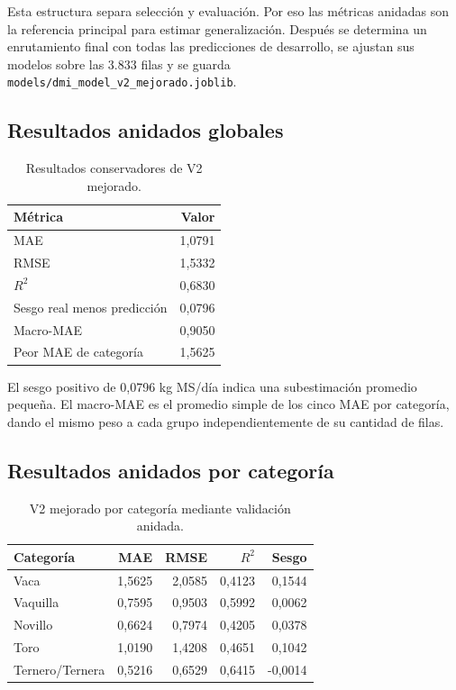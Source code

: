 \documentclass[11pt,a4paper]{article}
\newcommand{\codigo}[1]{\nolinkurl{#1}}
\begin{document}
Esta estructura separa selección y evaluación. Por eso las métricas anidadas son la referencia principal para estimar generalización. Después se determina un enrutamiento final con todas las predicciones de desarrollo, se ajustan sus modelos sobre las 3.833 filas y se guarda \codigo{models/dmi_model_v2_mejorado.joblib}.

\subsection{Resultados anidados globales}

\begin{table}[H]
\centering
\caption{Resultados conservadores de V2 mejorado.}
\begin{tabular}{lr}
\toprule
\textbf{Métrica} & \textbf{Valor}\\
\midrule
MAE & 1,0791\\
RMSE & 1,5332\\
$R^2$ & 0,6830\\
Sesgo real menos predicción & 0,0796\\
Macro-MAE & 0,9050\\
Peor MAE de categoría & 1,5625\\
\bottomrule
\end{tabular}
\end{table}

El sesgo positivo de 0,0796 kg MS/día indica una subestimación promedio pequeña. El macro-MAE es el promedio simple de los cinco MAE por categoría, dando el mismo peso a cada grupo independientemente de su cantidad de filas.

\subsection{Resultados anidados por categoría}

\begin{table}[H]
\centering
\caption{V2 mejorado por categoría mediante validación anidada.}
\begin{tabular}{lrrrr}
\toprule
\textbf{Categoría} & \textbf{MAE} & \textbf{RMSE} & \textbf{$R^2$} & \textbf{Sesgo}\\
\midrule
Vaca & 1,5625 & 2,0585 & 0,4123 & 0,1544\\
Vaquilla & 0,7595 & 0,9503 & 0,5992 & 0,0062\\
Novillo & 0,6624 & 0,7974 & 0,4205 & 0,0378\\
Toro & 1,0190 & 1,4208 & 0,4651 & 0,1042\\
Ternero/Ternera & 0,5216 & 0,6529 & 0,6415 & -0,0014\\
\bottomrule
\end{tabular}
\end{table}
\end{document}
